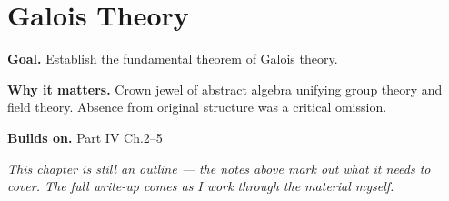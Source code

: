 \chapter{Galois Theory}
\label{ch:04-abstract-algebra-06}

\begin{chapterintro}
\textbf{Goal.} Establish the fundamental theorem of Galois theory.

\textbf{Why it matters.} Crown jewel of abstract algebra unifying group theory and field theory. Absence from original structure was a critical omission.

\textbf{Builds on.} Part IV Ch.2–5
\end{chapterintro}

\textit{This chapter is still an outline --- the notes above mark out what it needs to cover. The full write-up comes as I work through the material myself.}
